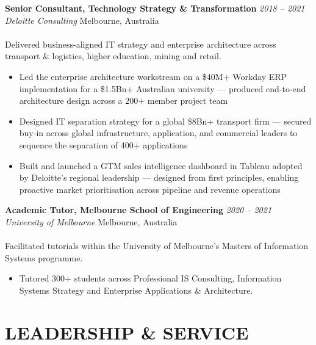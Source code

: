 \documentclass[margin]{res}
\begin{document}
\begin{resume}
        \textbf{Senior Consultant, Technology Strategy \& Transformation} \hfill \textit{2018 -- 2021} \\
        \textit{Deloitte Consulting} \hfill Melbourne, Australia\\\\
        {Delivered business-aligned IT strategy and enterprise architecture across transport \& logistics, higher education, mining and retail.}

        \begin{itemize} \itemsep +1pt

            \item Led the enterprise architecture workstream on a \$40M+ Workday ERP implementation for a \$1.5Bn+ Australian university --- produced end-to-end architecture design across a 200+ member project team

            \item Designed IT separation strategy for a global \$8Bn+ transport firm --- secured buy-in across global infrastructure, application, and commercial leaders to sequence the separation of 400+ applications

            \item Built and launched a GTM sales intelligence dashboard in Tableau adopted by Deloitte's regional leadership --- designed from first principles, enabling proactive market prioritisation across pipeline and revenue operations

        \end{itemize}

        \textbf{Academic Tutor, Melbourne School of Engineering} \hfill \textit{2020 -- 2021} \\
        \textit{University of Melbourne} \hfill Melbourne, Australia\\\\
        {Facilitated tutorials within the University of Melbourne's Masters of Information Systems programme.}

        \begin{itemize} \itemsep +1pt
            \item Tutored 300+ students across Professional IS Consulting, Information Systems Strategy and Enterprise Applications \& Architecture.
        \end{itemize}

        \vspace{1mm}

        \section{LEADERSHIP \& SERVICE}


\end{resume}
\end{document}
